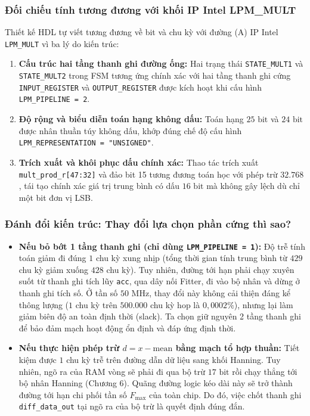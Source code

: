 \subsubsection*{Đối chiếu tính tương đương với khối IP Intel LPM\_MULT}
Thiết kế HDL tự viết tương đương về bit và chu kỳ với đường (A) IP Intel \texttt{LPM\_MULT} vì ba lý do kiến trúc:
\begin{enumerate}[leftmargin=1.5em, itemsep=2pt]
    \item \textbf{Cấu trúc hai tầng thanh ghi đường ống:} Hai trạng thái \texttt{STATE\_MULT1} và \texttt{STATE\_MULT2} trong FSM tương ứng chính xác với hai tầng thanh ghi cứng \texttt{INPUT\_REGISTER} và \texttt{OUTPUT\_REGISTER} được kích hoạt khi cấu hình \texttt{LPM\_PIPELINE = 2}.
    \item \textbf{Độ rộng và biểu diễn toán hạng không dấu:} Toán hạng $25\text{ bit}$ và $24\text{ bit}$ được nhân thuần túy không dấu, khớp đúng chế độ cấu hình \texttt{LPM\_REPRESENTATION = "UNSIGNED"}.
    \item \textbf{Trích xuất và khôi phục dấu chính xác:} Thao tác trích xuất \texttt{mult\_prod\_r[47:32]} và đảo bit 15 tương đương toán học với phép trừ $32.768$, tái tạo chính xác giá trị trung bình có dấu $16\text{ bit}$ mà không gây lệch dù chỉ một bit đơn vị LSB.
\end{enumerate}

\subsubsection*{Đánh đổi kiến trúc: Thay đổi lựa chọn phần cứng thì sao?}
\begin{itemize}[leftmargin=1.5em, itemsep=2pt]
    \item \textbf{Nếu bỏ bớt 1 tầng thanh ghi (chỉ dùng \texttt{LPM\_PIPELINE = 1}):} Độ trễ tính toán giảm đi đúng $1$ chu kỳ xung nhịp (tổng thời gian tính trung bình từ $429$ chu kỳ giảm xuống $428$ chu kỳ). Tuy nhiên, đường tới hạn phải chạy xuyên suốt từ thanh ghi tích lũy \texttt{acc}, qua dây nối Fitter, đi vào bộ nhân và dừng ở thanh ghi tích số. Ở tần số $50\text{ MHz}$, thay đổi này không cải thiện đáng kể thông lượng ($1$ chu kỳ trên $500.000$ chu kỳ hop là $0{,}0002\%$), nhưng lại làm giảm biên độ an toàn định thời (slack). Ta chọn giữ nguyên 2 tầng thanh ghi để bảo đảm mạch hoạt động ổn định và đáp ứng định thời.
    \item \textbf{Nếu thực hiện phép trừ $d = x - \text{mean}$ bằng mạch tổ hợp thuần:} Tiết kiệm được $1$ chu kỳ trễ trên đường dẫn dữ liệu sang khối Hanning. Tuy nhiên, ngõ ra của RAM vòng sẽ phải đi qua bộ trừ $17\text{ bit}$ rồi chạy thẳng tới bộ nhân Hanning (Chương 6). Quãng đường logic kéo dài này sẽ trở thành đường tới hạn chi phối tần số $F_{\max}$ của toàn chip. Do đó, việc chốt thanh ghi \texttt{diff\_data\_out} tại ngõ ra của bộ trừ là quyết định đúng đắn.
\end{itemize}

